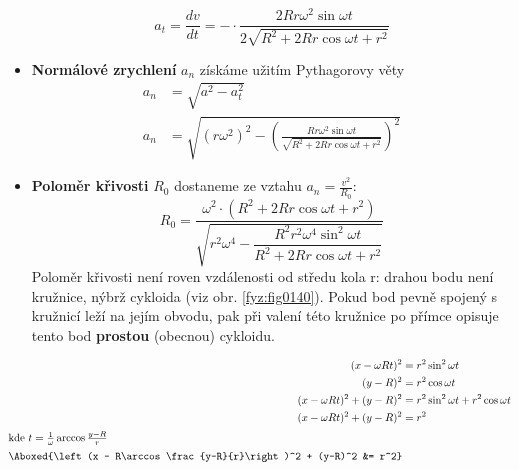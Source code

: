 \begin{mdframed}[style=mdexam]
\begin{example}
\begin{itemize}
\begin{equation*}
          a_t = \frac{dv}{dt} = -\cdot\frac{2Rr\omega^2\sin\omega t }{2\sqrt{R^2 + 
                  2Rr\cos\omega t + r^2}}
        \end{equation*}
      \item \textbf{Normálové zrychlení} \(a_n\) získáme užitím Pythagorovy věty
        \begin{align*}
          a_n &= \sqrt{a^2 - a_t^2}                                                 \\
          a_n &= \sqrt{(r\omega^2)^2-\left(
                \frac{Rr\omega^2\sin\omega t}
                      {\sqrt{R^2 + 2Rr\cos\omega t + r^2}}\right)^2}
        \end{align*}
      \item \textbf{Poloměr křivosti} $R_0$ dostaneme ze vztahu $a_n=\frac{v^2}{R_0}$:
        \begin{equation*}
            R_0 =  \dfrac{\omega^2\cdot(R^2 + 2Rr\cos\omega t + r^2)}{\sqrt{r^2\omega^4 - 
                    \dfrac{R^2r^2\omega^4\sin^2\omega t}{R^2 + 2Rr\cos\omega t + r^2}}}
        \end{equation*}
        Poloměr křivosti není roven vzdálenosti od středu kola r: drahou bodu není kružnice, nýbrž 
        cykloida (viz obr. \ref{fyz:fig0140}). Pokud bod pevně spojený s kružnicí leží na 
        jejím obvodu, pak při valení této kružnice po přímce opisuje tento bod \textbf{prostou} 
        (obecnou) cykloidu. 
    \end{itemize}
    
    \begin{gather*}
      \begin{align*}
        (x - \omega R t)^2            &= r^2\sin^2\omega t                          \\
        (y-R)^2                       &= r^2\cos\omega t                            \\
        (x - \omega R t)^2 + (y-R)^2  &= r^2\sin^2\omega t + r^2\cos\omega t        \\
        (x - \omega R t)^2 + (y-R)^2  &= r^2 \quad                                  \\
        \shortintertext{kde \(t = \frac{1}{\omega}\arccos\frac{y-R}{r}\)}
        \Aboxed{\left(x - R\arccos\frac{y-R}{r}\right)^2 + (y-R)^2  &= r^2}
      \end{align*}
    \end{gather*}

    {\centering
      \captionsetup{type=figure}
      \label{fyz:fig0140}
      \par}       
      \vspace{1em}
    

\end{example}
\end{mdframed}
